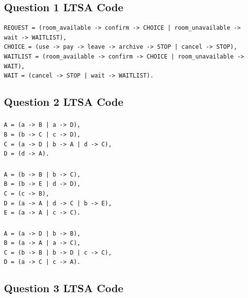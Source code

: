 \documentclass{article}[8pt]
\begin{document}
\subsection{Question 1 LTSA Code}

\begin{lstlisting}
REQUEST = (room_available -> confirm -> CHOICE | room_unavailable -> wait -> WAITLIST),
CHOICE = (use -> pay -> leave -> archive -> STOP | cancel -> STOP),
WAITLIST = (room_available -> confirm -> CHOICE | room_unavailable -> WAIT),
WAIT = (cancel -> STOP | wait -> WAITLIST).
\end{lstlisting}

\subsection{Question 2 LTSA Code}

\subsubsection{}

\begin{lstlisting}
A = (a -> B | a -> D),
B = (b -> C | c -> D),
C = (a -> D | b -> A | d -> C),
D = (d -> A).
\end{lstlisting}

\subsubsection{}

\begin{lstlisting}
A = (b -> B | b -> C),
B = (b -> E | d -> D),
C = (c -> B),
D = (a -> A | d -> C | b -> E),
E = (a -> A | c -> C).
\end{lstlisting}

\subsubsection{}

\begin{lstlisting}
A = (a -> D | b -> B),
B = (a -> A | a -> C),
C = (b -> B | b -> D | c -> C),
D = (a -> C | c -> A).
\end{lstlisting}

\subsection{Question 3 LTSA Code}
\end{document}
